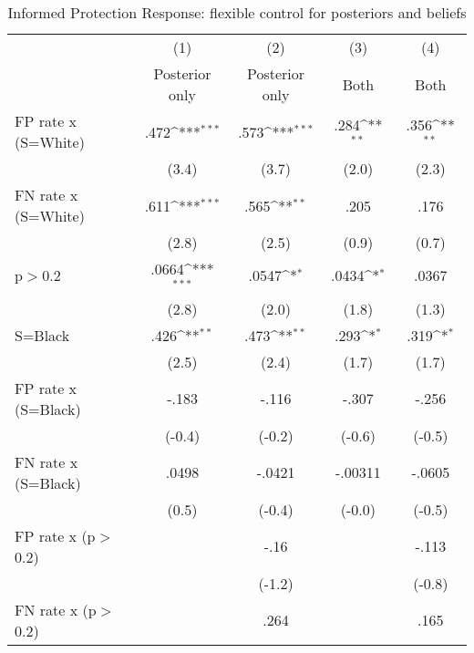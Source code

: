 \begin{table}[htbp]\centering
\def\sym#1{\ifmmode^{#1}\else\(^{#1}\)\fi}
\caption{Informed Protection Response: flexible control for posteriors and beliefs}
\begin{tabular}{l*{4}{c}}
\hline\hline
                &\multicolumn{1}{c}{(1)}&\multicolumn{1}{c}{(2)}&\multicolumn{1}{c}{(3)}&\multicolumn{1}{c}{(4)}\\
                &\multicolumn{1}{c}{Posterior only}&\multicolumn{1}{c}{Posterior only}&\multicolumn{1}{c}{Both}&\multicolumn{1}{c}{Both}\\
\hline
FP rate x (S=White)&     .472\sym{***}&     .573\sym{***}&     .284\sym{**} &     .356\sym{**} \\
                &    (3.4)         &    (3.7)         &    (2.0)         &    (2.3)         \\
FN rate x (S=White)&     .611\sym{***}&     .565\sym{**} &     .205         &     .176         \\
                &    (2.8)         &    (2.5)         &    (0.9)         &    (0.7)         \\
p$>$0.2         &    .0664\sym{***}&    .0547\sym{*}  &    .0434\sym{*}  &    .0367         \\
                &    (2.8)         &    (2.0)         &    (1.8)         &    (1.3)         \\
S=Black         &     .426\sym{**} &     .473\sym{**} &     .293\sym{*}  &     .319\sym{*}  \\
                &    (2.5)         &    (2.4)         &    (1.7)         &    (1.7)         \\
FP rate x (S=Black)&    -.183         &    -.116         &    -.307         &    -.256         \\
                &   (-0.4)         &   (-0.2)         &   (-0.6)         &   (-0.5)         \\
FN rate x (S=Black)&    .0498         &   -.0421         &  -.00311         &   -.0605         \\
                &    (0.5)         &   (-0.4)         &   (-0.0)         &   (-0.5)         \\
FP rate x (p$>$0.2)&                  &     -.16         &                  &    -.113         \\
                &                  &   (-1.2)         &                  &   (-0.8)         \\
FN rate x (p$>$0.2)&                  &     .264         &                  &     .165         \\

\end{tabular}
\end{table}
